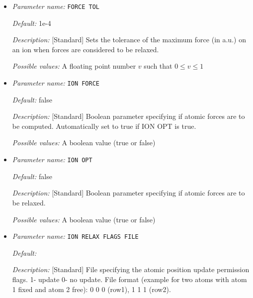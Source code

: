 \begin{itemize}
{\it Possible values:} A boolean value (true or false)
\item {\it Parameter name:} {\tt FORCE TOL}
\label{parameters:Geometry/Optimization/FORCE TOL}
\label{parameters:Geometry/Optimization/FORCE_20TOL}




{\it Default:} 1e-4


{\it Description:} [Standard] Sets the tolerance of the maximum force (in a.u.) on an ion when forces are considered to be relaxed.


{\it Possible values:} A floating point number $v$ such that $0 \leq v \leq 1$
\item {\it Parameter name:} {\tt ION FORCE}
\label{parameters:Geometry/Optimization/ION FORCE}
\label{parameters:Geometry/Optimization/ION_20FORCE}




{\it Default:} false


{\it Description:} [Standard] Boolean parameter specifying if atomic forces are to be computed. Automatically set to true if ION OPT is true.


{\it Possible values:} A boolean value (true or false)
\item {\it Parameter name:} {\tt ION OPT}
\label{parameters:Geometry/Optimization/ION OPT}
\label{parameters:Geometry/Optimization/ION_20OPT}




{\it Default:} false


{\it Description:} [Standard] Boolean parameter specifying if atomic forces are to be relaxed.


{\it Possible values:} A boolean value (true or false)
\item {\it Parameter name:} {\tt ION RELAX FLAGS FILE}
\label{parameters:Geometry/Optimization/ION RELAX FLAGS FILE}
\label{parameters:Geometry/Optimization/ION_20RELAX_20FLAGS_20FILE}




{\it Default:} 


{\it Description:} [Standard] File specifying the atomic position update permission flags. 1- update 0- no update. File format (example for two atoms with atom 1 fixed and atom 2 free): 0 0 0 (row1), 1 1 1 (row2).



\end{itemize}
